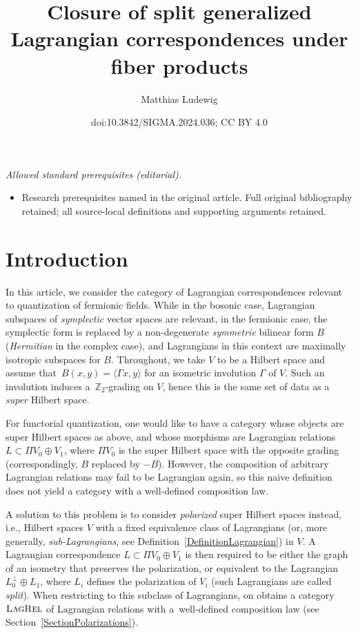 \documentclass[10pt,a4paper]{amsart}
\title{Closure of split generalized Lagrangian correspondences under fiber products}
\author{Matthias Ludewig}
\date{doi:10.3842/SIGMA.2024.036; CC BY 4.0}
\numberwithin{equation}{section}
\newcommand{\LagRel}{\textsc{LagRel}}
\newcommand{\Z}{\mathbb{Z}}
\begin{document}
\maketitle
\noindent\textit{Allowed standard prerequisites (editorial).}\begin{itemize}
\item Research prerequisites named in the original article. Full original bibliography retained; all source-local definitions and supporting arguments retained.
\end{itemize}\medskip
\section{Introduction}

In this article, we consider the category of Lagrangian correspondences relevant to quantization of fermionic fields.
While in the bosonic case, Lagrangian subspaces of \emph{symplectic} vector spaces are relevant, in the fermionic case, the symplectic form is replaced by a non-degenerate \emph{symmetric} bilinear form $B$ (\emph{Hermitian} in the complex case), and Lagrangians in this context are maximally isotropic subspaces for $B$.
Throughout, we take $V$ to be a Hilbert space and assume that~${B(x, y) = \langle \Gamma x, y\rangle}$ for an isometric involution $\Gamma$ of $V$.
Such an involution induces a~$\Z_2$-grading on $V$, hence this is the same set of data as a \emph{super} Hilbert space.

For functorial quantization, one would like to have a category whose objects are super Hilbert spaces as above, and whose morphisms are Lagrangian relations $L \subset \Pi V_0 \oplus V_1$, where $\Pi V_0$ is the super Hilbert space with the opposite grading (correspondingly, $B$ replaced by $-B$).
However, the composition of arbitrary Lagrangian relations may fail to be Lagrangian again, so this naive definition does not yield a category with a well-defined composition law.

A solution to this problem is to consider \emph{polarized} super Hilbert spaces instead, i.e., Hilbert spaces $V$ with a fixed equivalence class of Lagrangians (or, more generally, \emph{sub-Lagrangians}, see Definition~\ref{DefinitionLagrangian}) in $V$.
A Lagrangian correspondence $L \subset \Pi V_0 \oplus V_1$ is then required to be either the graph of an isometry that preserves the polarization, or equivalent to the Lagrangian $L_0^\perp \oplus L_1$, where $L_i$ defines the polarization of $V_i$ (such Lagrangians are called \emph{split}).
When restricting to this subclass of Lagrangians, on obtains a category $\LagRel$ of Lagrangian relations with a~well-defined composition law (see Section~\ref{SectionPolarizations}).
\end{document}
